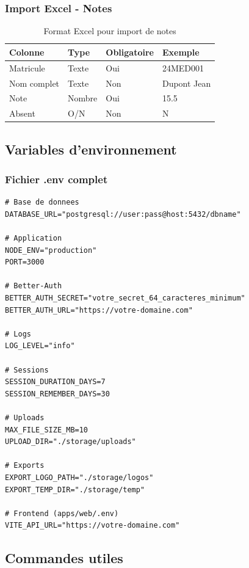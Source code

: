 \subsubsection{Import Excel - Notes}

\begin{table}[h]
\centering
\footnotesize
\begin{tabular}{|l|l|l|l|}
\hline
\textbf{Colonne} & \textbf{Type} & \textbf{Obligatoire} & \textbf{Exemple} \\
\hline
Matricule & Texte & Oui & 24MED001 \\
Nom complet & Texte & Non & Dupont Jean \\
Note & Nombre & Oui & 15.5 \\
Absent & O/N & Non & N \\
\hline
\end{tabular}
\caption{Format Excel pour import de notes}
\end{table}

\subsection{Variables d'environnement}

\subsubsection{Fichier .env complet}

\begin{lstlisting}[frame=single, basicstyle=\small\ttfamily]
# Base de donnees
DATABASE_URL="postgresql://user:pass@host:5432/dbname"

# Application
NODE_ENV="production"
PORT=3000

# Better-Auth
BETTER_AUTH_SECRET="votre_secret_64_caracteres_minimum"
BETTER_AUTH_URL="https://votre-domaine.com"

# Logs
LOG_LEVEL="info"

# Sessions
SESSION_DURATION_DAYS=7
SESSION_REMEMBER_DAYS=30

# Uploads
MAX_FILE_SIZE_MB=10
UPLOAD_DIR="./storage/uploads"

# Exports
EXPORT_LOGO_PATH="./storage/logos"
EXPORT_TEMP_DIR="./storage/temp"

# Frontend (apps/web/.env)
VITE_API_URL="https://votre-domaine.com"
\end{lstlisting}

\subsection{Commandes utiles}

